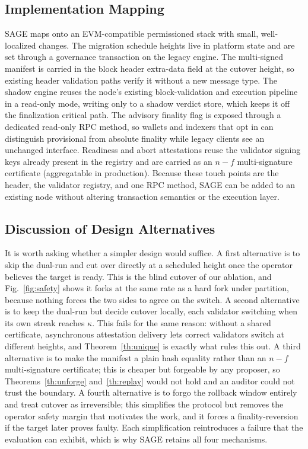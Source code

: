 \documentclass[journal]{IEEEtran}
\theoremstyle{definition}
\theoremstyle{remark}
\begin{document}
\subsection{Implementation Mapping}
SAGE maps onto an EVM-compatible permissioned stack with small, well-localized changes. The
migration schedule heights live in platform state and are set through a governance transaction
on the legacy engine. The multi-signed manifest is carried in the block header extra-data
field at the cutover height, so existing header validation paths verify it without a new message
type. The shadow engine reuses the node's existing block-validation and execution pipeline in a
read-only mode, writing only to a shadow verdict store, which keeps it off the finalization
critical path. The advisory finality flag is exposed through a dedicated read-only RPC method, so
wallets and indexers that opt in can distinguish provisional from absolute finality while legacy
clients see an unchanged interface. Readiness and abort attestations reuse the validator signing
keys already present in the registry and are carried as an $n{-}f$ multi-signature certificate
(aggregatable in production). Because these touch points are the header, the validator registry,
and one RPC method, SAGE can be added to an
existing node without altering transaction semantics or the execution layer.

\subsection{Discussion of Design Alternatives}
It is worth asking whether a simpler design would suffice. A first alternative is to skip the
dual-run and cut over directly at a scheduled height once the operator believes the target is
ready. This is the blind cutover of our ablation, and Fig.~\ref{fig:safety} shows it forks at the
same rate as a hard fork under partition, because nothing forces the two sides to agree on the
switch. A second alternative is to keep the dual-run but decide cutover locally, each validator
switching when its own streak reaches $\kappa$. This fails for the same reason: without a shared
certificate, asynchronous attestation delivery lets correct validators switch at different
heights, and Theorem~\ref{th:unique} is exactly what rules this out. A third alternative is to
make the manifest a plain hash equality rather than an $n{-}f$ multi-signature certificate; this is cheaper but
forgeable by any proposer, so Theorems~\ref{th:unforge} and~\ref{th:replay} would not hold and an
auditor could not trust the boundary. A fourth alternative is to forgo the rollback window
entirely and treat cutover as irreversible; this simplifies the protocol but removes the operator
safety margin that motivates the work, and it forces a finality-reversion if the target later
proves faulty. Each simplification reintroduces a failure that the evaluation can exhibit, which
is why SAGE retains all four mechanisms.
\end{document}

